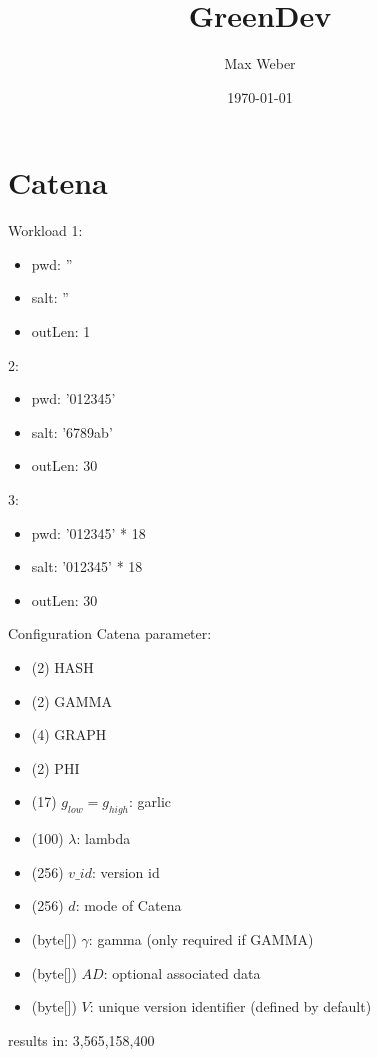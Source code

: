 \documentclass[11pt,aspectratio=169]{beamer}
\title[Green Development]{GreenDev}
\author[M. Weber]{Max Weber}
\institute[Bauhaus-Universität Weimar]{}
\date[\today]{\today}
\begin{document}

\maketitle


\section{Catena}

\begin{frame}{Workload}
  1: 
  \begin{itemize}
    \item pwd: ''
    \item salt: ''
    \item outLen: 1
  \end{itemize}
  2:
  \begin{itemize}
    \item pwd: '012345'
    \item salt: '6789ab'
    \item outLen: 30
  \end{itemize}
  3:
  \begin{itemize}
    \item pwd: '012345' * 18
    \item salt: '012345' * 18
    \item outLen: 30
  \end{itemize}
\end{frame}

\begin{frame}{Configuration}
  Catena parameter:
  \begin{itemize}
    \item (2) HASH
    \item (2) GAMMA
    \item (4) GRAPH
    \item (2) PHI

    \item (17) $g_{low}=g_{high}$: garlic
    \item (100) $\lambda$: lambda
    \item (256) $v\_id$: version id
    \item (256) $d$: mode of Catena
  
    \item (byte[]) $\gamma$: gamma (only required if GAMMA)
    \item (byte[]) $AD$: optional associated data
    \item (byte[]) $V$: unique version identifier (defined by default)
  \end{itemize}
  results in: 3,565,158,400
\end{frame}
\end{document}
